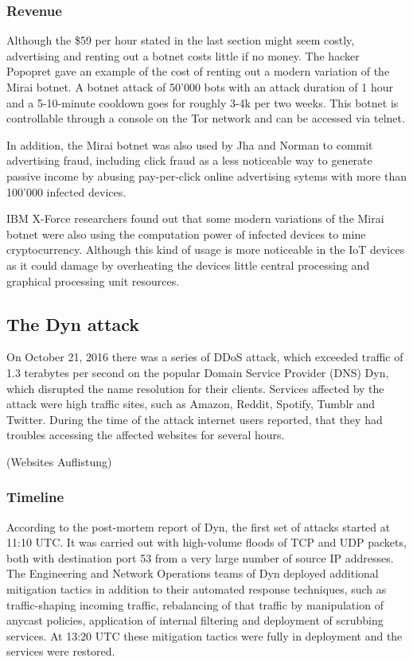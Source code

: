 	\subsubsection{Revenue}
	Although the \$59 per hour stated in the last section might seem costly, advertising and renting out a botnet costs little if no money. The hacker Popopret gave an example of the cost of renting out a modern variation of the Mirai botnet. A botnet attack of 50'000 bots with an attack duration of 1 hour and a 5-10-minute cooldown goes for roughly 3-4k per two weeks. This botnet is controllable through a console on the Tor network and can be accessed via telnet.
	
In addition, the Mirai botnet was also used by Jha and Norman to commit advertising fraud, including click fraud as a less noticeable way to generate passive income by abusing pay-per-click online advertising sytems with more than 100'000 infected devices.

IBM X-Force researchers found out that some modern variations of the Mirai botnet were also using the computation power of infected devices to mine cryptocurrency. Although this kind of usage is more noticeable in the IoT devices as it could damage by overheating the devices little central processing and graphical processing unit resources. \cite{DeBeck19}

	\subsection{The Dyn attack}
	On October 21, 2016 there was a series of DDoS attack, which exceeded traffic of 1.3 terabytes per second on the popular Domain Service Provider (DNS) Dyn, which disrupted the name resolution for their clients. Services affected by the attack were high traffic sites, such as Amazon, Reddit, Spotify, Tumblr and Twitter. During the time of the attack internet users reported, that they had troubles accessing the affected websites for several hours.\cite{Moss16}
	
	(Websites Auflistung)
	
		\subsubsection{Timeline}
		According to the post-mortem report of Dyn, the first set of attacks started at 11:10 UTC. It was carried out with high-volume floods of TCP and UDP packets, both with destination port 53 from a very large number of source IP addresses. The Engineering and Network Operations teams of Dyn deployed additional mitigation tactics in addition to their automated response techniques, such as traffic-shaping incoming traffic, rebalancing of that traffic by manipulation of anycast policies, application of internal filtering and deployment of scrubbing services. At 13:20 UTC these mitigation tactics were fully in deployment and the services were restored. \cite{Dyn16}
		
